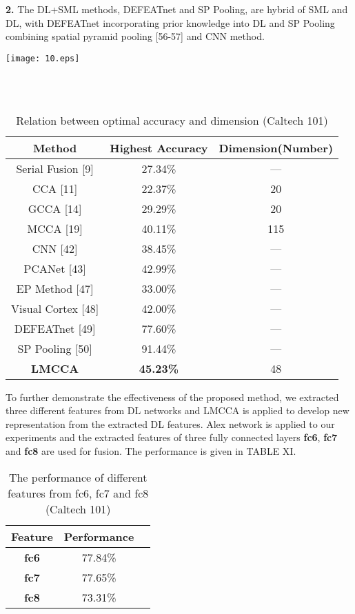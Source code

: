 \documentclass[journal]{IEEEtran}
\begin{document}
\textbf{2.} The DL+SML methods, DEFEATnet and SP Pooling, are hybrid of SML and DL, with DEFEATnet incorporating prior knowledge into DL and SP Pooling combining spatial pyramid pooling [56-57] and CNN method.\\\indent
\centerline {\texttt{[image: 10.eps]}}\\ \\\indent
\vspace*{-10pt}
\begin{table}[h]
\small
\renewcommand{\arraystretch}{1.4}
\caption{\normalsize{Relation between optimal accuracy and dimension (Caltech 101)}}
\setlength{\abovecaptionskip}{0pt}
\setlength{\belowcaptionskip}{10pt}
\centering
\tabcolsep 0.07in
\begin{tabular}{ccc}
\hline
Method & Highest Accuracy & Dimension(Number)\\
\hline
Serial Fusion [9] &27.34\% & ---\\
CCA [11] &22.37\% & 20\\
GCCA [14] &29.29\% & 20\\
MCCA [19] &40.11\% & 115\\
CNN [42] &38.45\% & ---\\
PCANet [43] &42.99\% & ---\\
EP Method [47] &33.00\% & ---\\
Visual Cortex [48] &42.00\% & ---\\
DEFEATnet [49] &77.60\% & ---\\
SP Pooling [50] &91.44\% & ---\\
\textbf{LMCCA} & \textbf{45.23\%} & 48\\
\hline
\end{tabular}
\end{table}

To further demonstrate the effectiveness of the proposed method, we extracted three different features from DL networks and LMCCA is applied to develop new representation from the extracted DL features. Alex network is applied to our experiments and the extracted features of three fully connected layers \textbf{fc6}, \textbf{fc7} and \textbf{fc8} are used for fusion. The performance is given in TABLE XI.\\
\vspace*{-10pt}
\begin{table}[h]
\small
\renewcommand{\arraystretch}{1.4}
\caption{\normalsize{The performance of different features from \textnormal{fc6}, \textnormal{fc7} and \textnormal{fc8} (Caltech 101)}}
\setlength{\abovecaptionskip}{0pt}
\setlength{\belowcaptionskip}{10pt}
\centering
\tabcolsep 0.07in
\begin{tabular}{ccc}
\hline
Feature & Performance\\
\hline
\textbf{fc6} & 77.84\% \\
\textbf{fc7} & 77.65\% \\
\textbf{fc8} & 73.31\% \\
\hline
\end{tabular}
\end{table}
\end{document}
